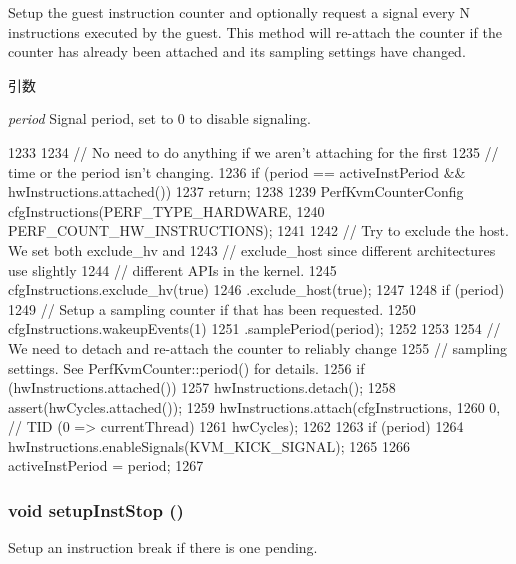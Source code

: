 Setup the guest instruction counter and optionally request a signal every N instructions executed by the guest. This method will re-\/attach the counter if the counter has already been attached and its sampling settings have changed.


\begin{DoxyParams}{引数}
\item[{\em period}]Signal period, set to 0 to disable signaling. \end{DoxyParams}



\begin{DoxyCode}
1233 {
1234     // No need to do anything if we aren't attaching for the first
1235     // time or the period isn't changing.
1236     if (period == activeInstPeriod && hwInstructions.attached())
1237         return;
1238 
1239     PerfKvmCounterConfig cfgInstructions(PERF_TYPE_HARDWARE,
1240                                          PERF_COUNT_HW_INSTRUCTIONS);
1241 
1242     // Try to exclude the host. We set both exclude_hv and
1243     // exclude_host since different architectures use slightly
1244     // different APIs in the kernel.
1245     cfgInstructions.exclude_hv(true)
1246         .exclude_host(true);
1247 
1248     if (period) {
1249         // Setup a sampling counter if that has been requested.
1250         cfgInstructions.wakeupEvents(1)
1251             .samplePeriod(period);
1252     }
1253 
1254     // We need to detach and re-attach the counter to reliably change
1255     // sampling settings. See PerfKvmCounter::period() for details.
1256     if (hwInstructions.attached())
1257         hwInstructions.detach();
1258     assert(hwCycles.attached());
1259     hwInstructions.attach(cfgInstructions,
1260                           0, // TID (0 => currentThread)
1261                           hwCycles);
1262 
1263     if (period)
1264         hwInstructions.enableSignals(KVM_KICK_SIGNAL);
1265 
1266     activeInstPeriod = period;
1267 }
\end{DoxyCode}
\hypertarget{classBaseKvmCPU_a10bd071dda7c87970b3595b2d3c5408e}{
\subsubsection[{setupInstStop}]{\setlength{\rightskip}{0pt plus 5cm}void setupInstStop ()}}
\label{classBaseKvmCPU_a10bd071dda7c87970b3595b2d3c5408e}
Setup an instruction break if there is one pending.

